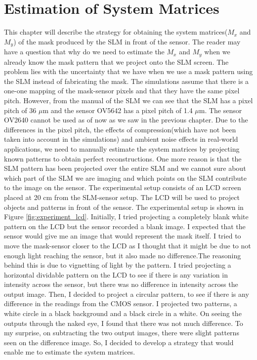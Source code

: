 \chapter{Estimation of System Matrices}
This chapter will describe the strategy for obtaining the system matrices($M_x$ and $M_y$) of the mask produced by the SLM in front of the sensor. The reader may have a question that why do we need to estimate the $M_x$ and $M_y$ when we already know the mask pattern that we project onto the SLM screen. The problem lies with the uncertainty that we have when we use a mask pattern using the SLM instead of fabricating the mask. The simulations assume that there is a one-one mapping of the mask-sensor pixels and that they have the same pixel pitch. However, from the manual of the SLM\cite{LC2012MAN}  we can see that the SLM has a pixel pitch of 36 $\mu$m and the sensor OV5642 has a pixel pitch of 1.4 $\mu$m. The sensor OV2640 cannot be used as of now as we saw in the previous chapter. Due to the differences in the pixel pitch, the effects of compression(which have not been taken into account in the simulations) and ambient noise effects in real-world applications, we need to manually estimate the system matrices by projecting known patterns to obtain perfect reconstructions. One more reason is that the SLM pattern has been projected over the entire SLM and we cannot sure about which part of the SLM we are imaging and which points on the SLM contribute to the image on the sensor. 
The experimental setup consists of an LCD screen placed at 20 cm from the SLM-sensor setup. The LCD will be used to project objects and patterns in front of the sensor. The experimental setup is shown in Figure \ref{fig:experiment_lcd}.
Initially, I tried projecting a completely blank white pattern on the LCD but the sensor recorded a blank image. I expected that the sensor would give me an image that would represent the mask itself. I tried to move the mask-sensor closer to the LCD as I thought that it might be due to not enough light reaching the sensor, but it also made no difference.The reasoning behind this is due to vignetting of light by the pattern. I tried projecting a horizontal dividable pattern on the LCD to see if there is any variation in intensity across the sensor, but there was no difference in intensity across the output image. Then, I decided to project a circular pattern, to see if there is any difference in the readings from the CMOS sensor. I projected two patterns, a white circle in a black background and a black circle in a white. On seeing the outputs through the naked eye, I found that there was not much difference. To my surprise, on subtracting the two output images, there were slight patterns seen on the difference image. So, I decided to develop a strategy that would enable me to estimate the system matrices.

